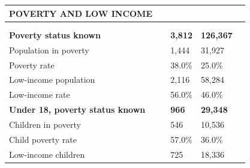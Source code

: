 \documentclass[9pt]{report}
\begin{document}
\vspace{12pt}
\setlength{\tabcolsep}{.01in} %
\begin{tabular}{p{.10in}p{.10in}p{.10in}p{3.7in}>{\hfill}p{.85in}>{\hfill}p{.85in}>{\hfill}p{.85in}>{\hfill}p{.85in}p{0.1in}}
\multicolumn{9}{l}{\parbox{7.1in}{\raggedright{\large{\strut\textbf{POVERTY AND LOW INCOME}\strut}}}} \\ 
\hline
\multicolumn{4}{l}{\parbox{3.5in}{\raggedright{\textbf{}}}} & \multicolumn{1}{r}{\parbox{.85in}{\strut\raggedleft{\textbf{}\strut}}} & \multicolumn{1}{r}{\parbox{.85in}{\strut\raggedleft{\textbf{}\strut}}} & \multicolumn{1}{r}{\parbox{.85in}{\strut{}}} & \multicolumn{1}{r}{\parbox{.85in}{\strut{}}} & \\ 
\multicolumn{9}{l}{} \\ 
\multicolumn{4}{l}{\parbox{3.5in}{\strut\raggedright{\textbf{Poverty status known}\strut}}} & \textbf{} & \textbf{} & \textbf{3,812} & \textbf{126,367} & \textbf{} \\ 
\multicolumn{4}{l}{\parbox{3.6in}{\strut\raggedright{{Population in poverty}}\strut}} &  &  & 1,444 & 31,927 & \multicolumn{1}{l}{}  \\ 
\multicolumn{4}{l}{\parbox{3.6in}{\strut\raggedright{{Poverty rate}}\strut}} &  &  & 38.0\% & 25.0\% & \multicolumn{1}{l}{}  \\ 
\multicolumn{4}{l}{\parbox{3.6in}{\strut\raggedright{{Low-income population}}\strut}} &  &  & 2,116 & 58,284 & \multicolumn{1}{l}{}  \\ 
\multicolumn{4}{l}{\parbox{3.6in}{\strut\raggedright{{Low-income rate}}\strut}} &  &  & 56.0\% & 46.0\% & \multicolumn{1}{l}{}  \\ 
\multicolumn{4}{l}{\parbox{3.5in}{\strut\raggedright{\textbf{Under 18, poverty status known}\strut}}} & \textbf{} & \textbf{} & \textbf{966} & \textbf{29,348} & \textbf{} \\ 
\multicolumn{4}{l}{\parbox{3.6in}{\strut\raggedright{{Children in poverty}}\strut}} &  &  & 546 & 10,536 & \multicolumn{1}{l}{}  \\ 
\multicolumn{4}{l}{\parbox{3.6in}{\strut\raggedright{{Child poverty rate}}\strut}} &  &  & 57.0\% & 36.0\% & \multicolumn{1}{l}{}  \\ 
\multicolumn{4}{l}{\parbox{3.6in}{\strut\raggedright{{Low-income children}}\strut}} &  &  & 725 & 18,336 & \multicolumn{1}{l}{}  \\ 

\end{tabular}
\end{document}
